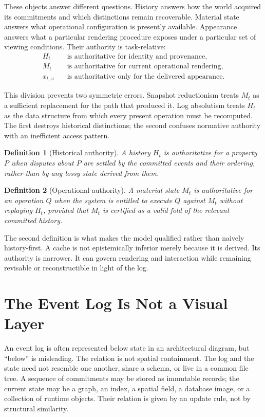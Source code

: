\documentclass[11pt]{article}
\newtheorem{definition}{Definition}
\begin{document}
These objects answer different questions. History answers how the world acquired its commitments and which distinctions remain recoverable. Material state answers what operational configuration is presently available. Appearance answers what a particular rendering procedure exposes under a particular set of viewing conditions. Their authority is task-relative:
\begin{align}
H_t &\quad \text{is authoritative for identity and provenance},\\
M_t &\quad \text{is authoritative for current operational rendering},\\
x_{t,\omega} &\quad \text{is authoritative only for the delivered appearance.}
\end{align}

This division prevents two symmetric errors. Snapshot reductionism treats $M_t$ as a sufficient replacement for the path that produced it. Log absolutism treats $H_t$ as the data structure from which every present operation must be recomputed. The first destroys historical distinctions; the second confuses normative authority with an inefficient access pattern.

\begin{definition}[Historical authority]
A history $H_t$ is authoritative for a property $P$ when disputes about $P$ are settled by the committed events and their ordering, rather than by any lossy state derived from them.
\end{definition}

\begin{definition}[Operational authority]
A material state $M_t$ is authoritative for an operation $Q$ when the system is entitled to execute $Q$ against $M_t$ without replaying $H_t$, provided that $M_t$ is certified as a valid fold of the relevant committed history.
\end{definition}

The second definition is what makes the model qualified rather than naively history-first. A cache is not epistemically inferior merely because it is derived. Its authority is narrower. It can govern rendering and interaction while remaining revisable or reconstructible in light of the log.

\section{The Event Log Is Not a Visual Layer}

An event log is often represented below state in an architectural diagram, but ``below'' is misleading. The relation is not spatial containment. The log and the state need not resemble one another, share a schema, or live in a common file tree. A sequence of commitments may be stored as immutable records; the current state may be a graph, an index, a spatial field, a database image, or a collection of runtime objects. Their relation is given by an update rule, not by structural similarity.
\end{document}
